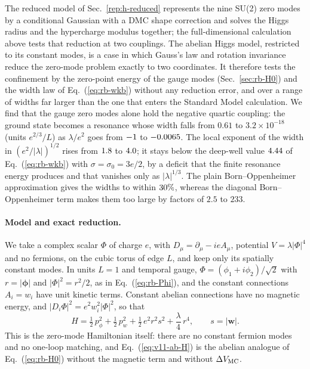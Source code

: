 The reduced model of Sec.~\ref{rep:h-reduced} represents the nine SU(2) zero modes by a conditional Gaussian with a DMC shape correction and solves the Higgs radius and the hypercharge modulus together; the full-dimensional calculation above tests that reduction at two couplings.
The abelian Higgs model, restricted to its constant modes, is a case in which Gauss's law and rotation invariance reduce the zero-mode problem exactly to two coordinates.
It therefore tests the confinement by the zero-point energy of the gauge modes (Sec.~\ref{sec:rb-H0}) and the width law of Eq.~(\ref{eq:rb-wkb}) without any reduction error, and over a range of widths far larger than the one that enters the Standard Model calculation.
We find that the gauge zero modes alone hold the negative quartic coupling: the ground state becomes a resonance whose width falls from $0.61$ to $3.2\times10^{-18}$ (units $e^{2/3}/L$) as $\lambda/e^2$ goes from $-1$ to $-0.0065$. %
The local exponent of the width in $(e^2/|\lambda|)^{1/2}$ rises from $1.8$ to $4.0$; it stays below the deep-well value $4.44$ of Eq.~(\ref{eq:rb-wkb}) with $\sigma=\sigma_0=3e/2$, by a deficit that the finite resonance energy produces and that vanishes only as $|\lambda|^{1/3}$. %
The plain Born--Oppenheimer approximation gives the widths to within $30\%$, whereas the diagonal Born--Oppenheimer term makes them too large by factors of $2.5$ to $233$. %

\paragraph{Model and exact reduction.}
We take a complex scalar $\Phi$ of charge $e$, with $D_\mu=\partial_\mu-ieA_\mu$, potential $V=\lambda|\Phi|^4$ and no fermions, on the cubic torus of edge $L$, and keep only its spatially constant modes.
In units $L=1$ and temporal gauge, $\Phi=(\phi_1+i\phi_2)/\sqrt2$ with $r=|\bm\phi|$ and $|\Phi|^2=r^2/2$, as in Eq.~(\ref{eq:rb-Phi}), and the constant connections $A_i=w_i$ have unit kinetic terms.
Constant abelian connections have no magnetic energy, and $|D_i\Phi|^2=e^2w_i^2|\Phi|^2$, so that
\begin{equation}
H=\tfrac12\,p_\phi^2+\tfrac12\,p_w^2+\tfrac12\,e^2r^2s^2+\frac\lambda4\,r^4,\qquad s=|\bm w| .
\label{eq:v11-ab-H}
\end{equation}
This is the zero-mode Hamiltonian itself: there are no constant fermion modes and no one-loop matching, and Eq.~(\ref{eq:v11-ab-H}) is the abelian analogue of Eq.~(\ref{eq:rb-H0}) without the magnetic term and without $\Delta V_{\rm MC}$.


